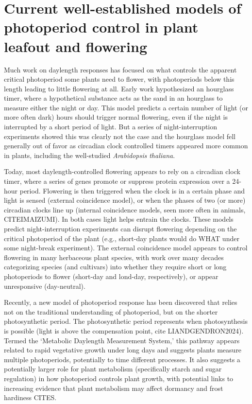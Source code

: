 \documentclass[11pt]{article}
\begin{document}
\section*{Current well-established models of photoperiod control in plant leafout and flowering}
Much work on daylength responses has focused on what controls the apparent critical photoperiod some plants need to flower, with photoperiods below this length leading to little flowering at all. Early work hypothesized an hourglass timer, where a hypothetical substance acts as the sand in an hourglass to measure either the night or day. This model predicts a certain number of light (or more often dark) hours should trigger normal flowering, even if the night is interrupted by a short period of light. But a series of night-interruption experiments showed this was clearly not the case and the hourglass model fell generally out of favor as circadian clock controlled timers appeared more common in plants, including the well-studied \emph{Arabidopsis thaliana}. 

Today, most daylength-controlled flowering appears to rely on a circadian clock timer, where a series of genes promote or suppress protein expression over a 24-hour period. Flowering is then triggered when the clock is in a certain phase and light is sensed (external coincidence model), or when the phases of two (or more) circadian clocks line up (internal coincidence models, seen more often in animals, CITEIMAIZUMI). In both cases light helps entrain the clocks. %
These models predict night-interruption experiments can disrupt flowering depending on the critical photoperiod of the plant (e.g., short-day plants would do WHAT under some night-break experiment). The external coincidence model appears to control flowering in many herbaceous plant species, with work over many decades categorizing species (and cultivars) into whether they require short or long photoperiods to flower (short-day and lond-day, respectively), or appear unresponsive (day-neutral). %

Recently, a new model of photoperiod response has been discovered that relies not on the traditional understanding of photoperiod, but on the shorter photosynthetic period. The photosynthetic period represents when photosynthesis is possible (light is above the compensation point, cite LIANDGENDRON2024). %
Termed the `Metabolic Daylength Measurement System,'  this pathway appears related to rapid vegetative growth under long days and suggests plants measure multiple photoperiods, potentially to time different processes. It also suggests a potentially larger role for plant metabolism (specifically starch and sugar regulation) in how photoperiod controls plant growth, with potential links to increasing evidence that plant metabolism may affect dormancy and frost hardiness CITES. %
\end{document}
